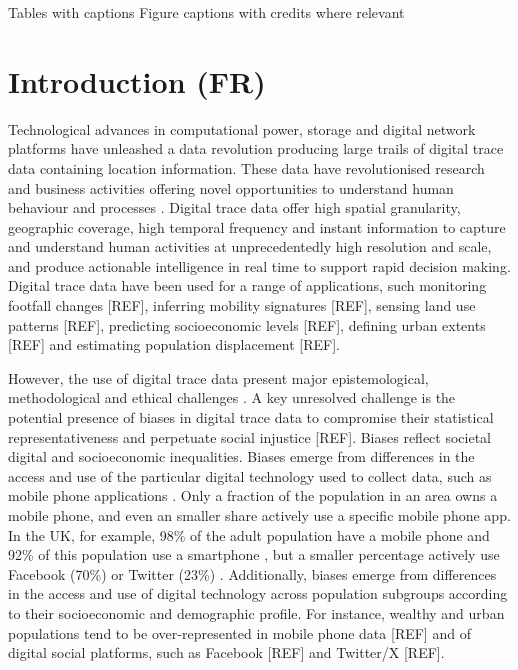 \documentclass[]{rsos}%
\begin{document}
Tables with captions Figure captions with credits where relevant

\newpage

\hypertarget{introduction-fr}{%
\section{Introduction (FR)}\label{introduction-fr}}

Technological advances in computational power, storage and digital
network platforms have unleashed a data revolution producing large
trails of digital trace data containing location information. These data
have revolutionised research and business activities offering novel
opportunities to understand human behaviour and processes
\citep{rowe23-bigdata}. Digital trace data offer high spatial granularity,
geographic coverage, high temporal frequency and instant information to
capture and understand human activities at unprecedentedly high
resolution and scale, and produce actionable intelligence in real time
to support rapid decision making. Digital trace data have been used for
a range of applications, such monitoring footfall changes {[}REF{]},
inferring mobility signatures {[}REF{]}, sensing land use patterns {[}REF{]},
predicting socioeconomic levels {[}REF{]}, defining urban extents {[}REF{]} and
estimating population displacement {[}REF{]}.

However, the use of digital trace data present major epistemological,
methodological and ethical challenges \citep{rowe23-bigdata}. A key
unresolved challenge is the potential presence of biases in digital
trace data to compromise their statistical representativeness and
perpetuate social injustice {[}REF{]}. Biases reflect societal digital and
socioeconomic inequalities. Biases emerge from differences in the access
and use of the particular digital technology used to collect data, such
as mobile phone applications \citep{wesolowski13-biases}. Only a fraction of
the population in an area owns a mobile phone, and even an smaller share
actively use a specific mobile phone app. In the UK, for example, 98\% of
the adult population have a mobile phone and 92\% of this population use
a smartphone \citep{ofcom23}, but a smaller percentage actively use Facebook
(70\%) or Twitter (23\%) \citep{statista24}. Additionally, biases emerge from
differences in the access and use of digital technology across
population subgroups according to their socioeconomic and demographic
profile. For instance, wealthy and urban populations tend to be
over-represented in mobile phone data {[}REF{]} and of digital social
platforms, such as Facebook {[}REF{]} and Twitter/X {[}REF{]}.
\end{document}
